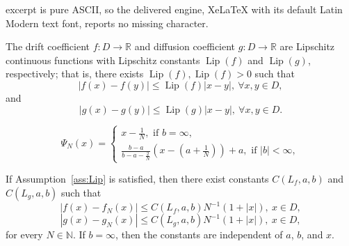 \documentclass[10pt,a4paper]{amsart}
\newcommand{\Lip}{\operatorname{Lip}}
\begin{document}
excerpt is pure ASCII, so the delivered engine, XeLaTeX with its default Latin Modern text font, reports no missing character.
\begin{assumption}\label{ass:Lip}
The drift coefficient $f: D \to \mathbb{R}$ and diffusion coefficient $g: D \to \mathbb{R}$ are Lipschitz continuous functions with Lipschitz constants $\Lip(f)$ and $\Lip(g)$, respectively; that is, there exists $\Lip(f), \Lip(f)>0$ such that
\begin{equation*}
|f(x) - f(y)| \leq \Lip(f) |x-y|,\ \forall x,y \in D,
\end{equation*}
and 
\begin{equation*}
|g(x) - g(y)| \leq \Lip(g) |x-y|,\ \forall x,y \in D.
\end{equation*}
\end{assumption}

\begin{equation}\label{eq:psiDef}
\Psi_{N}(x) = 
\begin{cases}
x - \frac{1}{N}, \text{ if } b = \infty,\\
\frac{b-a}{b-a-\frac{2}{N}} \left( x - \left( a + \frac{1}{N} \right) \right) + a, \text{ if } |b| < \infty,
\end{cases}
\end{equation}

\begin{lemma}\label{lem:fNgNdiff}
If Assumption~\ref{ass:Lip} is satisfied, then there exist constants $C(L_{f},a,b)$ and $C(L_{g},a,b)$ such that
\begin{equation*}
\left| f(x) - f_{N}(x) \right| \leq C(L_{f},a,b) N^{-1} (1 + |x|),\ x \in D,
\end{equation*}
\begin{equation*}
\left| g(x) - g_{N}(x) \right| \leq C(L_{g},a,b) N^{-1} (1 + |x|),\ x \in D,
\end{equation*}
for every $N \in \mathbb{N}$. If $b=\infty$, then the constants are independent of $a$, $b$, and $x$.
\end{lemma}
\end{document}
